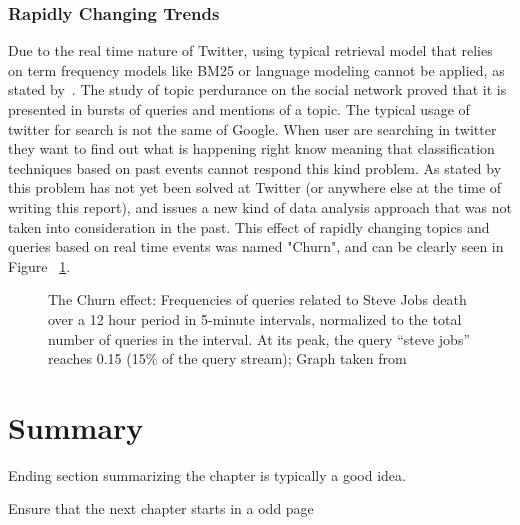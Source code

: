 \subsubsection{Rapidly Changing Trends} 
\label{ssub:real_time_}
Due to the real time nature of Twitter, using typical retrieval model that relies on term frequency models like BM25 or language modeling cannot be applied, as stated by~\citet{Lin2012}. The study of topic perdurance on the social network proved that it is presented in bursts of queries and mentions of a topic. The typical usage of twitter for search is not the same of Google. When user are searching in twitter they want to find out what is happening right know meaning that classification techniques based on past events cannot respond this kind problem. As stated by~\citet{Lin2012} this problem has not yet been solved at Twitter (or anywhere else at the time of writing this report), and issues a new kind of data analysis approach that was not taken into consideration in the past. 
This effect of rapidly changing topics and queries based on real time events was named "Churn", and can be clearly seen in Figure ~\ref{fig:churn}.

  \begin{figure}[tb]
    \begin{center}
    \noindent{}
    \end{center}
    \caption{The Churn effect: Frequencies of queries related to Steve Jobs death over a 12 hour period in 5-minute intervals, normalized to the total number of queries in the interval. At its peak, the query “steve jobs” reaches 0.15 (15\% of the query stream); Graph taken from~\cite{Lin2012}}
    \label{fig:churn}
  \end{figure}


\section{Summary}
Ending section summarizing the chapter is typically a good idea.

Ensure that the next chapter starts in a odd page
\cleardoublepage 
